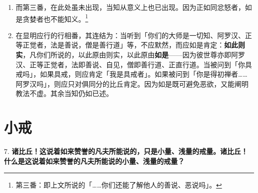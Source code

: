 \begin{enumerate}
\item 而第三番，在此处虽未出现，当知从意义上也已出现。因为正如同忿怒者，如是贪婪者也不能知义。\footnote{第三番：即上文所说的「……你们还能了解他人的善说、恶说吗」。}
\item 在显明应行的行相番，其连结为：当听到「你们的大师是一切知、阿罗汉、正等正觉者，法是善说，僧是善行道」等，不应默然，而应如是肯定：\textbf{如此则实}，凡你们所说的，以此原由则实，以此原由\textbf{如是}——因为彼世尊亦即阿罗汉、正等正觉者，法即善说、自见，僧即善行道、正直行道。当被问到「你具戒吗」，如果具戒，则应肯定「我是具戒者」。如果被问到「你是得初禅者……阿罗汉吗」，则应只对俱同分的比丘肯定。因为如是既可避免恶欲，又能阐明教法不虚。其余当知仍如已述。\end{enumerate}

\section{小戒}

{\Large 7.} \textbf{诸比丘！这说着如来赞誉的凡夫所能说的，只是小量、浅量的戒量。诸比丘！什么是这说着如来赞誉的凡夫所能说的小量、浅量的戒量？}

